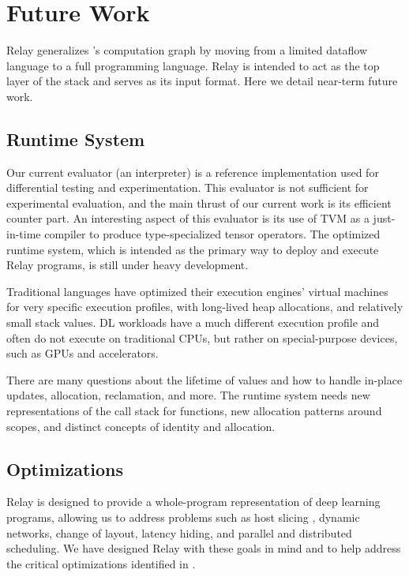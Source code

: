 \section{Future Work}
\label{future_work}

Relay generalizes \nnvm's computation graph by moving from a limited dataflow language
to a full programming language. Relay is intended to act as the top layer of
the \tvm stack and serves as its input format. Here we detail near-term future work.

\subsection{Runtime System}

Our current evaluator (an interpreter) is a reference implementation used for differential testing and
experimentation. This evaluator is not sufficient for experimental evaluation, and the main thrust of
our current work is its efficient counter part. An interesting aspect of this evaluator is its
use of TVM as a just-in-time compiler to produce type-specialized tensor operators. The
optimized runtime system, which is intended as the primary way to deploy and execute
Relay programs, is still under heavy development.

Traditional languages have optimized their execution engines'
virtual machines for very specific execution profiles, with long-lived heap
allocations, and relatively small stack values. DL workloads have a
much different execution profile and often do not execute on
traditional CPUs, but rather on special-purpose devices, such as GPUs and
accelerators.

There are many questions about the lifetime of values and how
to handle in-place updates, allocation, reclamation, and more.
The runtime system needs new representations of the
call stack for functions, new allocation patterns
around scopes, and distinct concepts of identity and
allocation.

\subsection{Optimizations}

Relay is designed to provide a whole-program representation of
deep learning programs, allowing us to address problems such as
host slicing \cite{tf_swift}, dynamic networks, change of layout,
latency hiding, and parallel and distributed scheduling. We have designed
Relay with these goals in mind and to help address the critical
optimizations identified in \cite{TVMSysML}.

